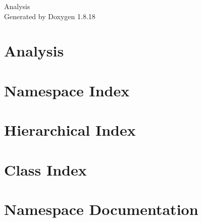 \let\mypdfximage\pdfximage\def\pdfximage{\immediate\mypdfximage}\documentclass[twoside]{book}
\newcommand{\+}{\discretionary{\mbox{\scriptsize$\hookleftarrow$}}{}{}}
\newcommand{\clearemptydoublepage}{%
  \newpage{\pagestyle{empty}\cleardoublepage}%
}
\begin{document}
\hypersetup{pageanchor=false,
             bookmarksnumbered=true,
             pdfencoding=unicode
            }
\begin{titlepage}
\vspace*{7cm}
\begin{center}%
{\Large Analysis }\\
\vspace*{1cm}
{\large Generated by Doxygen 1.8.18}\\
\end{center}
\end{titlepage}
\clearemptydoublepage
{}
\tableofcontents
\clearemptydoublepage
{}
\hypersetup{pageanchor=true}

\chapter{Analysis}
\label{index}\hypertarget{index}{}
\chapter{Namespace Index}

\chapter{Hierarchical Index}

\chapter{Class Index}

\chapter{Namespace Documentation}


\end{document}
